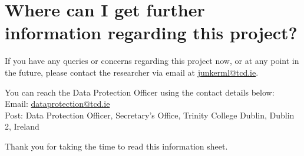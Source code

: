\section*{Where can I get further information regarding this project?}
If you have any queries or concerns regarding this project now, or at any point in the future, please contact the researcher via email at \href{mailto:junkerml@tcd.ie}{junkerml@tcd.ie}.

\vspace{0.5cm}
You can reach the Data Protection Officer using the contact details below:\\
Email: \href{mailto:dataprotection@tcd.ie}{dataprotection@tcd.ie}\\
Post: Data Protection Officer, Secretary's Office, Trinity College Dublin, Dublin 2, Ireland

\vspace{0.5cm}

Thank you for taking the time to read this information sheet.

